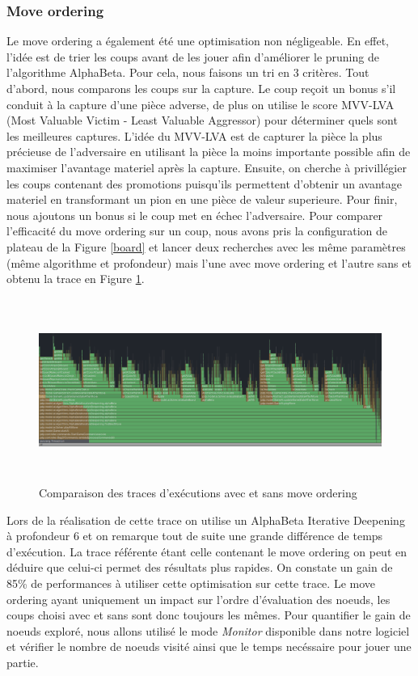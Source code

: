 \documentclass{article}
\begin{document}
\subsubsection{Move ordering}
Le move ordering a également été une optimisation non négligeable. En effet, l'idée est de trier les coups avant de les jouer afin d'améliorer le pruning de l'algorithme AlphaBeta. Pour cela,
nous faisons un tri en 3 critères. Tout d'abord, nous comparons les coups sur la capture. Le coup reçoit un bonus s'il conduit à la capture d'une pièce adverse, de plus on utilise le score MVV-LVA
(Most Valuable Victim - Least Valuable Aggressor) pour déterminer quels sont les meilleures captures. L'idée du MVV-LVA est de capturer la pièce la plus précieuse de l'adversaire en utilisant la pièce
la moins importante possible afin de maximiser l'avantage materiel après la capture. Ensuite, on cherche à privillégier les coups contenant des promotions puisqu'ils permettent d'obtenir un avantage materiel
en transformant un pion en une pièce de valeur superieure. Pour finir, nous ajoutons un bonus si le coup met en échec l'adversaire. Pour comparer l'efficacité du move ordering sur un coup, nous avons pris la 
configuration de plateau de la Figure \ref{board} et lancer deux recherches avec les même paramètres (même algorithme et profondeur) mais l'une avec move ordering et l'autre sans et obtenu la trace en Figure \ref{move_ordering_cmp}.
\begin{figure}[h]
    \centering
    \includegraphics[width=\textwidth,height=6.0cm,keepaspectratio]{trace_move_ordering.png}
    \caption{Comparaison des traces d'exécutions avec et sans move ordering}
    \label{move_ordering_cmp}
\end{figure}
\FloatBarrier

Lors de la réalisation de cette trace on utilise un AlphaBeta Iterative Deepening à profondeur 6 et on remarque tout de suite une grande différence de temps d'exécution. La trace référente
étant celle contenant le move ordering on peut en déduire que celui-ci permet des résultats plus rapides. On constate un gain de 85\% de performances à utiliser cette optimisation sur cette trace.
Le move ordering ayant uniquement un impact sur l'ordre d'évaluation des noeuds, les coups choisi avec et sans sont donc toujours les mêmes. Pour quantifier le gain de noeuds exploré, nous allons 
utilisé le mode \textit{Monitor} disponible dans notre logiciel et vérifier le nombre de noeuds visité ainsi que le temps necéssaire pour jouer une partie. 
\end{document}
